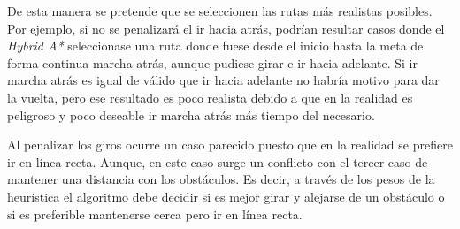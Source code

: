 De esta manera se pretende que se seleccionen las rutas más realistas posibles. Por ejemplo, si no se penalizará el ir hacia atrás, podrían resultar casos donde el \textit{Hybrid A*} seleccionase una ruta donde fuese desde el inicio hasta la meta de forma continua marcha atrás, aunque pudiese girar e ir hacia adelante. Si ir marcha atrás es igual de válido que ir hacia adelante no habría motivo para dar la vuelta, pero ese resultado es poco realista debido a que en la realidad es peligroso y poco deseable ir marcha atrás más tiempo del necesario.

Al penalizar los giros ocurre un caso parecido puesto que en la realidad se prefiere ir en línea recta. Aunque, en este caso surge un conflicto con el tercer caso de mantener una distancia con los obstáculos. Es decir, a través de los pesos de la heurística el algoritmo debe decidir si es mejor girar y alejarse de un obstáculo o si es preferible mantenerse cerca pero ir en línea recta.

